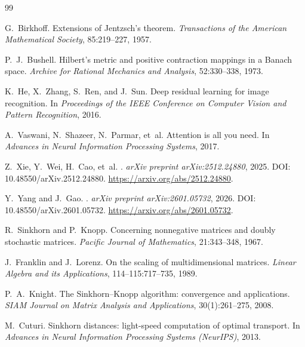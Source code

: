 \documentclass[10pt]{article}
\numberwithin{equation}{section}
\theoremstyle{plain}
\theoremstyle{definition}
\theoremstyle{remark}
\begin{document}
\begin{thebibliography}{99}

G.~Birkhoff.
\newblock Extensions of Jentzsch's theorem.
\newblock \emph{Transactions of the American Mathematical Society}, 85:219--227, 1957.

P.~J.~Bushell.
\newblock Hilbert's metric and positive contraction mappings in a Banach space.
\newblock \emph{Archive for Rational Mechanics and Analysis}, 52:330--338, 1973.

K.~He, X.~Zhang, S.~Ren, and J.~Sun.
\newblock Deep residual learning for image recognition.
\newblock In \emph{Proceedings of the IEEE Conference on Computer Vision and Pattern Recognition}, 2016.

A.~Vaswani, N.~Shazeer, N.~Parmar, et~al.
\newblock Attention is all you need.
\newblock In \emph{Advances in Neural Information Processing Systems}, 2017.

Z.~Xie, Y.~Wei, H.~Cao, et~al.
.
\newblock \emph{arXiv preprint arXiv:2512.24880}, 2025.
\newblock DOI: 10.48550/arXiv.2512.24880.
\newblock \url{https://arxiv.org/abs/2512.24880}.

Y.~Yang and J.~Gao.
.
\newblock \emph{arXiv preprint arXiv:2601.05732}, 2026.
\newblock DOI: 10.48550/arXiv.2601.05732.
\newblock \url{https://arxiv.org/abs/2601.05732}.


R.~Sinkhorn and P.~Knopp.
\newblock Concerning nonnegative matrices and doubly stochastic matrices.
\newblock \emph{Pacific Journal of Mathematics}, 21:343--348, 1967.

J.~Franklin and J.~Lorenz.
\newblock On the scaling of multidimensional matrices.
\newblock \emph{Linear Algebra and its Applications}, 114--115:717--735, 1989.

P.~A.~Knight.
\newblock The Sinkhorn--Knopp algorithm: convergence and applications.
\newblock \emph{SIAM Journal on Matrix Analysis and Applications}, 30(1):261--275, 2008.


M.~Cuturi.
\newblock Sinkhorn distances: light-speed computation of optimal transport.
\newblock In \emph{Advances in Neural Information Processing Systems (NeurIPS)}, 2013.


\end{thebibliography}
\end{document}

